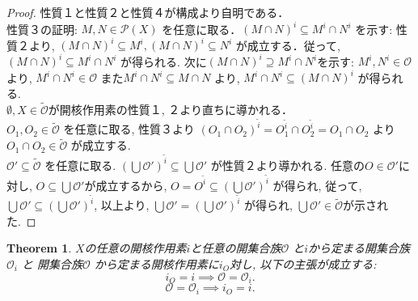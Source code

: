\documentclass[lualatex]{ltjsbook}
\newtheorem{theorem}{Theorem}[chapter]
\theoremstyle{remark}
\theoremstyle{plain}
\begin{document}
\begin{proof}
	性質１と性質２と性質４が構成より自明である．\\
	性質３の証明: $M ,  N \in \mathcal{P}(X)$ を任意に取る．$\left( M \cap N \right) ^{i} \subseteq M^{i} \cap N^{i}$ を示す: 性質２より,  $\left( M \cap N \right)^{i} \subseteq M^{i},  \left( M \cap N \right) ^{i} \subseteq N^{i} $ が成立する．従って,  $\left( M \cap  N \right) ^{i } \subseteq M^{i} \cap  N^{i}$ 
	が得られる. 次に$(M\cap N)^{i} \supseteq M^{i}  \cap  N ^{i}$を示す: $M^{i} ,  N^{i} \in \mathcal{O}$より, $ M^{i} \cap  N^{ i} \in \mathcal{O}$ また$M^{i} \cap N^{i} \subseteq M \cap N$ より,  $M^{i} \cap N^{i} \subseteq \left( M \cap N \right) ^{i}$ が得られる.\\
	$\emptyset ,  X \in \tilde{\mathcal{O}}$が開核作用素の性質１,  ２より直ちに導かれる．\\
	$O_1,  O_2 \in \tilde{\mathcal{O}}$ を任意に取る,  性質３より
	$(O_1 \cap O_2)^{\tilde{i}} = O_1 ^{\tilde{i}} \cap O_2^{\tilde{i}} = O_1 \cap O_2$ より $O_1 \cap O_2 \in \tilde{\mathcal{O}}$ が成立する.\\
	$\mathcal{O}' \subseteq \tilde{\mathcal{O}}$ を任意に取る. 
	$\left(\bigcup \mathcal{O}' \right) ^{\tilde{i}} \subseteq \bigcup \mathcal{O}'  $ が性質２より導かれる. 
	任意の$O \in \mathcal{O}'$に対し,  $O \subseteq \bigcup \mathcal{O}' $が成立するから,  
	$O = O^{\tilde{i}} \subseteq  \left(\bigcup \mathcal{O}'\right) ^{\tilde{i}}$ が得られ,  
	従って,  $\bigcup \mathcal{O}' \subseteq \left(\bigcup \mathcal{O}' \right)^{\tilde{i}}  $, 
	以上より,  $\bigcup \mathcal{O}' = \left( \bigcup \mathcal{O}'  \right) ^{\tilde{i}}$ が得られ,  
	$\bigcup \mathcal{O}' \in \tilde{\mathcal{O}}$が示された.
\end{proof}

\begin{theorem}
	$X$の任意の開核作用素$i$と任意の開集合族$\mathcal{O}$ 
	と$i$から定まる開集合族 $\mathcal{O}_i$ と
	開集合族$\mathcal{O}$ から定まる開核作用素に$i_O$対し,  以下の主張が成立する:
	\[
	i_O = i \implies \mathcal{O} = \mathcal{O}_i
	.\] 
	\[
	\mathcal{O} = \mathcal{O}_i \implies i_O = i
	.\] 
\end{theorem}
\end{document}
